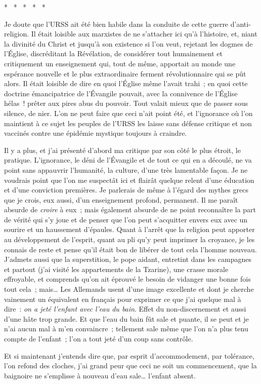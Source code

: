 \documentclass[french,twoside]{book} %
\begin{document}
\begin{center}
\noindent \centerline{*  *  *  *  *}\par
\end{center}

\noindent Je doute que l’URSS ait été bien habile dans la conduite de cette guerre d’anti-religion. Il était loisible aux marxistes de ne s’attacher ici qu’à l’histoire, et, niant la divinité du Christ et jusqu’à son existence si l’on veut, rejetant les dogmes de l’Église, discréditant la Révélation, de considérer tout humainement et critiquement un enseignement qui, tout de même, apportait au monde une espérance nouvelle et le plus extraordinaire ferment révolutionnaire qui se pût alors. Il était loisible de dire en quoi l’Église même l’avait trahi ; en quoi cette doctrine émancipatrice de l’Évangile pouvait, avec la connivence de l’Église hélas ! prêter aux pires abus du pouvoir. Tout valait mieux que de passer sous silence, de nier. L’on ne peut faire que ceci n’ait point été, et l’ignorance où l’on maintient à ce sujet les peuples de l’URSS les laisse sans défense critique et non vaccinés contre une épidémie mystique toujours à craindre.\par
Il y a plus, et j’ai présenté d’abord ma critique par son côté le plus étroit, le pratique. L’ignorance, le déni de l’Évangile et de tout ce qui en a découlé, ne va point sans appauvrir l’humanité, la culture, d’une très lamentable façon. Je ne voudrais point que l’on me suspectât ici et flairât quelque relent d’une éducation et d’une conviction premières. Je parlerais de même à l’égard des mythes grecs que je crois, eux aussi, d’un enseignement profond, permanent. Il me paraît absurde de \emph{croire} à eux ; mais également absurde de ne point reconnaître la part de vérité qui s’y joue et de penser que l’on peut s’acquitter envers eux avec un sourire et un haussement d’épaules. Quant à l’arrêt que la religion peut apporter au développement de l’esprit, quant au pli qu’y peut imprimer la croyance, je les connais de reste et pense qu’il était bon de libérer de tout cela l’homme nouveau. J’admets aussi que la superstition, le pope aidant, entretint dans les campagnes et partout (j’ai visité les appartements de la Tzarine), une crasse morale effroyable, et comprends qu’on ait éprouvé le besoin de vidanger une bonne fois tout cela ; mais… Les Allemands usent d’une image excellente et dont je cherche vainement un équivalent en français pour exprimer ce que j’ai quelque mal à dire : \emph{on a jeté l’enfant avec l’eau du bain}. Effet du non-discernement et aussi d’une hâte trop grande. Et que l’eau du bain fût sale et puante, il se peut et je n’ai aucun mal à m’en convaincre ; tellement sale même que l’on n’a plus tenu compte de l’enfant ; l’on a tout jeté d’un coup sans contrôle.\par
Et si maintenant j’entends dire que, par esprit d’accommodement, par tolérance, l’on refond des cloches, j’ai grand peur que ceci ne soit un commencement, que la baignoire ne s’emplisse à nouveau d’eau sale… l’enfant absent.
\end{document}
